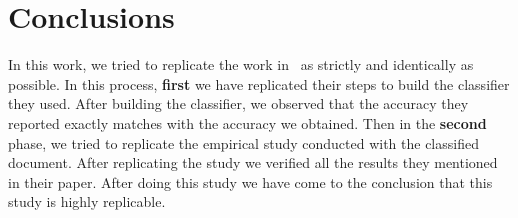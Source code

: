 \section{Conclusions}
\label{sect:conclusions}
In this work, we tried to replicate the work in~\cite{Brunet2014a} as strictly and identically as possible. In this process, \noindent\textbf{first} we have replicated their steps to build the classifier they used. After building the classifier, we observed that the accuracy they reported exactly matches with the accuracy we obtained. Then in the \noindent\textbf{second} phase, we tried to replicate the empirical study conducted with the classified document. After replicating the study we verified all the results they mentioned in their paper. After doing this study we have come to the conclusion that this study is highly replicable.    
